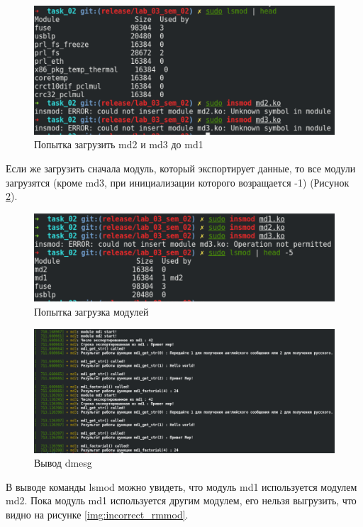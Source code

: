 \begin{figure}[H]
    \centering
    \includegraphics[scale=0.7]{img/part_02/incorrect_insmod.png}
    \caption{Попытка загрузить md2 и md3 до md1}
    \label{img:incorrect_insmod}
\end{figure}

Если же загрузить сначала модуль, который экспортирует данные, то все модули загрузятся (кроме md3, при инициализации которого возращается -1) (Рисунок \ref{img:insmod}).

\begin{figure}[H]
    \centering
    \includegraphics[scale=0.7]{img/part_02/insmod.png}
    \caption{Попытка загрузка модулей}
    \label{img:insmod}
\end{figure}

\begin{figure}[H]
    \centering
    \includegraphics[scale=0.5]{img/part_02/dmesg.png}
    \caption{Вывод dmesg}
\end{figure}

В выводе команды lsmod можно увидеть, что модуль md1 используется модулем md2. Пока модуль md1 используется другим модулем, его нельзя выгрузить, что видно на рисунке \ref{img:incorrect_rmmod}.


